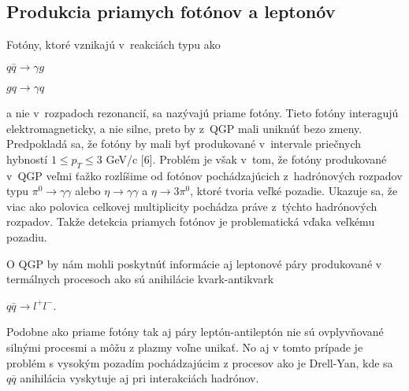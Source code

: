 \subsection{Produkcia priamych fotónov a leptonóv}
Fotóny, ktoré vznikajú v~reakciách typu ako
\begin{center}
  $q \bar{q} \longrightarrow \gamma g$
\end{center}
\begin{center}
  $g q \longrightarrow \gamma q$
\end{center}
a nie v~rozpadoch rezonancií, sa nazývajú priame fotóny. Tieto
fotóny interagujú elektromagneticky, a nie silne, preto by z~QGP  mali
uniknúť bezo zmeny. Predpokladá sa, že fotóny by mali
byť produkované v~intervale priečnych hybností $1 \leq
p_{T} \leq 3$ GeV/c [6]. Problém je však  v~tom, že fotóny
produkované v~QGP veľmi ťažko rozlíšime od
fotónov  pochádzajúcich z~hadrónových rozpadov typu $ \pi^{0}
\longrightarrow \gamma \gamma $ alebo $ \eta \longrightarrow \gamma \gamma$ a
$\eta \longrightarrow 3\pi^{0}$, ktoré tvoria veľké pozadie.
Ukazuje sa, že viac ako polovica celkovej multiplicity pochádza práve
z~týchto hadrónových rozpadov. Takže detekcia priamych fotónov je
problematická vďaka veľkému pozadiu.

O QGP by nám mohli poskytnúť informácie aj  leptonové páry
produkované v termálnych procesoch ako sú anihilácie kvark-antikvark
\begin{center}
  $q\bar{q} \longrightarrow l^{+}l^{-}$.
\end{center}
Podobne ako priame fotóny tak aj páry leptón-antileptón nie sú ovplyvňované
silnými procesmi a môžu z plazmy voľne unikať. No aj v tomto prípade je
problém s vysokým pozadím pochádzajúcim z procesov ako je Drell-Yan, kde sa
$q\bar{q}$ anihilácia  vyskytuje aj pri interakciách hadrónov.



